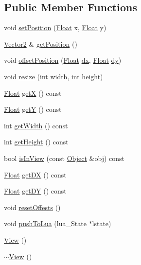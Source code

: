 \subsection*{Public Member Functions}
\begin{DoxyCompactItemize}
\item 
void \hyperlink{classZeta_1_1View_af4c0e58457aa46622246ddd7f465ccd6}{set\+Position} (\hyperlink{namespaceZeta_a1e0a1265f9b3bd3075fb0fabd39088ba}{Float} x, \hyperlink{namespaceZeta_a1e0a1265f9b3bd3075fb0fabd39088ba}{Float} y)
\item 
\hyperlink{classZeta_1_1Vector2}{Vector2} \& \hyperlink{classZeta_1_1View_a25dd04388b710e42f53549f18f5e5a90}{get\+Position} ()
\item 
void \hyperlink{classZeta_1_1View_a0a02a11d7f48361a35de1a61db622569}{offset\+Position} (\hyperlink{namespaceZeta_a1e0a1265f9b3bd3075fb0fabd39088ba}{Float} \hyperlink{classZeta_1_1View_adf5ca5e43a40a4632feffd60ce8d254d}{dx}, \hyperlink{namespaceZeta_a1e0a1265f9b3bd3075fb0fabd39088ba}{Float} \hyperlink{classZeta_1_1View_aceed4f0c37e9cd9a8a94aee93e3f4fbc}{dy})
\item 
void \hyperlink{classZeta_1_1View_ac297e2c57031f34b147e1550eebc3e50}{resize} (int width, int height)
\item 
\hyperlink{namespaceZeta_a1e0a1265f9b3bd3075fb0fabd39088ba}{Float} \hyperlink{classZeta_1_1View_a00bf63e3930cf0f9ff632488fa6788bc}{get\+X} () const 
\item 
\hyperlink{namespaceZeta_a1e0a1265f9b3bd3075fb0fabd39088ba}{Float} \hyperlink{classZeta_1_1View_a85b546983f9dabc964e3e727a29494c3}{get\+Y} () const 
\item 
int \hyperlink{classZeta_1_1View_a47bd2aa4ba6934688fe41bada087a718}{get\+Width} () const 
\item 
int \hyperlink{classZeta_1_1View_ac1f616a0eb0ca5c8bdff96cc4ddbb419}{get\+Height} () const 
\item 
bool \hyperlink{classZeta_1_1View_a9fed1802212e18237a44280c39071f8e}{is\+In\+View} (const \hyperlink{classZeta_1_1Object}{Object} \&obj) const 
\item 
\hyperlink{namespaceZeta_a1e0a1265f9b3bd3075fb0fabd39088ba}{Float} \hyperlink{classZeta_1_1View_a1abe87e74687ed7640eb315427a4db34}{get\+D\+X} () const 
\item 
\hyperlink{namespaceZeta_a1e0a1265f9b3bd3075fb0fabd39088ba}{Float} \hyperlink{classZeta_1_1View_a43152185d20ec0b21963f515505bcc2b}{get\+D\+Y} () const 
\item 
void \hyperlink{classZeta_1_1View_aee07f13e10c7f27af10e8fd8f0761201}{reset\+Offests} ()
\item 
void \hyperlink{classZeta_1_1View_ab607b1c586cf4060d0883cf82c8b9bc9}{push\+To\+Lua} (lua\+\_\+\+State $\ast$lstate)
\item 
\hyperlink{classZeta_1_1View_a6988bffe196af761a4501d0e43ce8e3f}{View} ()
\item 
\hyperlink{classZeta_1_1View_ab6dae38a92c2ee6af3bbe2b1f0f9ecfe}{$\sim$\+View} ()
\end{DoxyCompactItemize}
